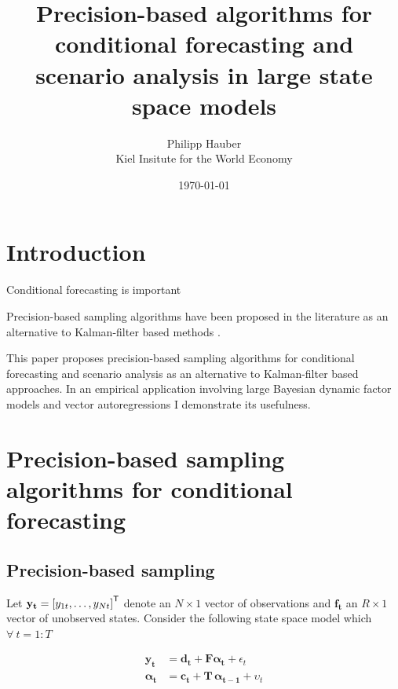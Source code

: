 \documentclass[notitlepage,a4paper,12pt]{article}
\newcommand{\transpose}[1]{{#1}^{\sf{T}}}
\begin{document}
\title{Precision-based algorithms for conditional forecasting and scenario analysis in large state space models}

\author{
  Philipp Hauber\\
  Kiel Insitute for the World Economy
}
\date{\today}

\maketitle

\section{Introduction}

Conditional forecasting is important \citep{bgl_2015ijf}

Precision-based sampling algorithms have been proposed in the literature as an alternative to Kalman-filter based methods \citep{chanjeliazkov_2009}.

This paper proposes precision-based sampling algorithms for conditional forecasting and scenario analysis as an alternative to Kalman-filter based approaches. In an empirical application involving large Bayesian dynamic factor models and vector autoregressions I demonstrate its usefulness. 

\section{Precision-based sampling algorithms for conditional forecasting}

\subsection{Precision-based sampling}

Let $\mathbf{y_t} = \transpose{[y_{1t}, \dots, y_{Nt}]}$ denote an $N \times 1$ vector of observations and $\mathbf{f_t}$ an $R \times 1$ vector of unobserved states. Consider the following state space model which $\forall \: t = 1:T$ 

\begin{subequations}
    \label{eqn:statespacesys}
    \begin{align}
        \mathbf{y_t} &= \mathbf{d_t} + \mathbf{F} \boldsymbol{\alpha_t} + \epsilon_t \label{eqn:statespacesys_meas}\\
        \boldsymbol{\alpha_t} &= \mathbf{c_t} + \mathbf{T} \, \boldsymbol{\alpha_{t-1}} + \upsilon_t \label{eqn:statespacesys_trans}
    \end{align}
\end{subequations}
\end{document}

